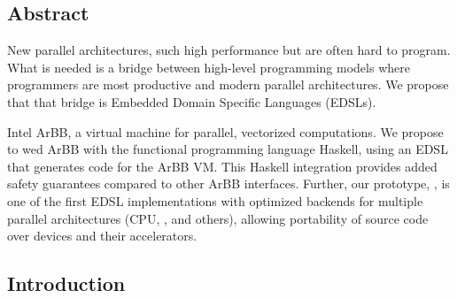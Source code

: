 

%
\subsection*{Abstract}
New parallel architectures, such 
 high
performance but are often hard to program.
What is needed is a bridge between high-level programming models 
where programmers are most productive and modern parallel architectures. 
We propose that that bridge is Embedded Domain Specific Languages (EDSLs). 

Intel ArBB, a virtual machine for parallel, vectorized computations.
We propose to wed ArBB with the functional programming language
Haskell, {using an EDSL} that generates code for the ArBB VM.  This Haskell integration provides 
added safety guarantees compared to other ArBB interfaces.
%
Further, our prototype, \systemname{}, is one of the first EDSL implementations with
optimized backends for multiple parallel architectures (CPU, , and
others), allowing portability of source code over devices
and their accelerators.






\subsection{Introduction}

